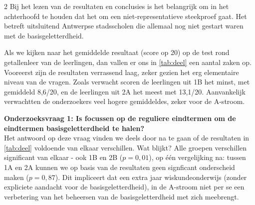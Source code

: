 \begin{multicols}{2}
Bij het lezen van de resultaten en conclusies is het belangrijk om in het achterhoofd te houden dat het om een niet-representatieve steekproef gaat. Het betreft uitsluitend Antwerpse stadsscholen die allemaal nog niet gestart waren met de basisgeletterdheid.

Als we kijken naar het gemiddelde resultaat (score op 20) op de test rond getallenleer van de leerlingen, dan vallen er ons in \autoref{tab:deel} een aantal zaken op. Vooreerst zijn de resultaten verrassend laag, zeker gezien het erg elementaire niveau van de vragen. Zoals verwacht scoren de leerlingen uit 1B het minst, met gemiddeld 8,6/20, en de leerlingen uit 2A het meest met 13,1/20. Aanvankelijk verwachtten de onderzoekers veel hogere gemiddeldes, zeker voor de A-stroom.


\textbf{Onderzoeksvraag 1: Is focussen op de reguliere eindtermen om de eindtermen basisgeletterdheid te halen?}\\

\noindent Het antwoord op deze vraag vinden we deels door na te gaan of de resultaten in \autoref{tab:deel} voldoende van elkaar verschillen. Wat blijkt? Alle groepen verschillen significant van elkaar - ook  1B en 2B ($p = 0,01$), op één vergelijking na: tussen 1A en 2A kunnen we op basis van de resultaten geen signficant onderscheid maken ($p=0,87$). Dit impliceert dat een extra jaar wiskundeonderwijs (zonder expliciete aandacht voor de basisgeletterdheid), in de A-stroom niet per se een verbetering van het beheersen van de basisgeletterdheid met zich meebrengt. 


\end{multicols}
